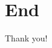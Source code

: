 \documentclass{beamer}
\begin{document}
\section{End}


\begin{frame}
\Huge{\centerline{Thank you!}}
\end{frame}

\end{document}
